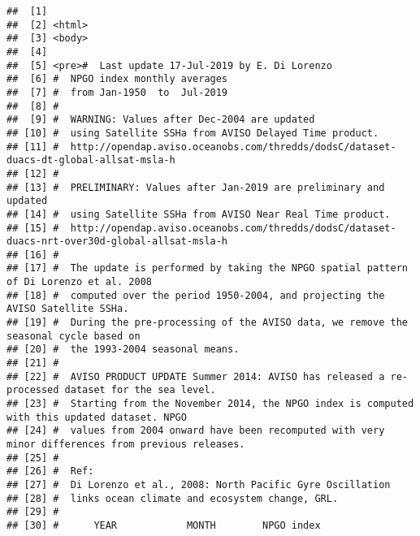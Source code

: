 \documentclass[11pt,]{article}
\begin{document}
\begin{verbatim}
##  [1]                                                                                                     
##  [2] <html>                                                                                              
##  [3] <body>                                                                                              
##  [4]                                                                                                     
##  [5] <pre>#  Last update 17-Jul-2019 by E. Di Lorenzo                                                    
##  [6] #  NPGO index monthly averages                                                                      
##  [7] #  from Jan-1950  to  Jul-2019                                                                      
##  [8] #                                                                                                   
##  [9] #  WARNING: Values after Dec-2004 are updated                                                       
## [10] #  using Satellite SSHa from AVISO Delayed Time product.                                            
## [11] #  http://opendap.aviso.oceanobs.com/thredds/dodsC/dataset-duacs-dt-global-allsat-msla-h            
## [12] #                                                                                                   
## [13] #  PRELIMINARY: Values after Jan-2019 are preliminary and updated                                   
## [14] #  using Satellite SSHa from AVISO Near Real Time product.                                          
## [15] #  http://opendap.aviso.oceanobs.com/thredds/dodsC/dataset-duacs-nrt-over30d-global-allsat-msla-h   
## [16] #                                                                                                   
## [17] #  The update is performed by taking the NPGO spatial pattern of Di Lorenzo et al. 2008             
## [18] #  computed over the period 1950-2004, and projecting the AVISO Satellite SSHa.                     
## [19] #  During the pre-processing of the AVISO data, we remove the seasonal cycle based on               
## [20] #  the 1993-2004 seasonal means.                                                                    
## [21] #                                                                                                   
## [22] #  AVISO PRODUCT UPDATE Summer 2014: AVISO has released a re-processed dataset for the sea level.   
## [23] #  Starting from the November 2014, the NPGO index is computed with this updated dataset. NPGO      
## [24] #  values from 2004 onward have been recomputed with very minor differences from previous releases. 
## [25] #                                                                                                   
## [26] #  Ref:                                                                                             
## [27] #  Di Lorenzo et al., 2008: North Pacific Gyre Oscillation                                          
## [28] #  links ocean climate and ecosystem change, GRL.                                                   
## [29] #                                                                                                   
## [30] #      YEAR            MONTH        NPGO index
\end{verbatim}
\end{document}
